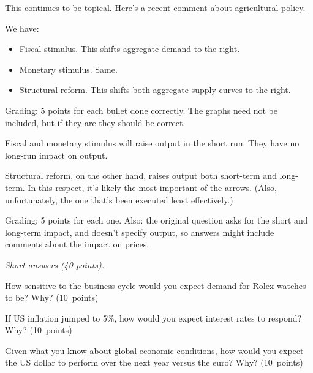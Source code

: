 \documentclass[letterpaper,12pt]{exam}
\begin{document}
\begin{questions}
\begin{solution}

This continues to be topical.  
Here's a 
\href{http://www.bloomberg.com/news/2013-12-12/abe-pushes-biggest-farm-revamp-since-macarthur-broke-landlords.html}
{recent comment} about agricultural policy.  

\begin{parts}
\item We have:
\begin{itemize}
\item Fiscal stimulus. This shifts aggregate demand to the right.
\item Monetary stimulus. Same.
\item Structural reform. This shifts both aggregate supply curves to the right.  
\end{itemize}
Grading:  5 points for each bullet done correctly.
The graphs need not be included, but if they are they should be correct.  

\item Fiscal and monetary stimulus will raise output in the short run. 
They have no long-run impact on output.  

Structural reform, on the other hand, raises output both short-term and long-term.  
In this respect, it's likely the most important of the arrows.  
(Also, unfortunately, the one that's been executed least effectively.) 

Grading: 5 points for each one.  
Also:  the original question asks for the short and long-term impact, and doesn't
specify output, so answers might include comments about the impact on prices.  
\end{parts}
\end{solution}


\item  {\it Short answers (40 points).\/}
\begin{parts}
\item  How sensitive to the business cycle would you expect demand for Rolex watches to be?
Why?
(10~points)

\item If US inflation jumped to 5\%, how would you expect
interest rates to respond?  Why?
(10~points)

\item  Given what you know about global economic conditions,
how would you expect the US dollar to perform over the next year versus the euro?  Why?
(10~points)


\end{parts}
\end{questions}
\end{document}

